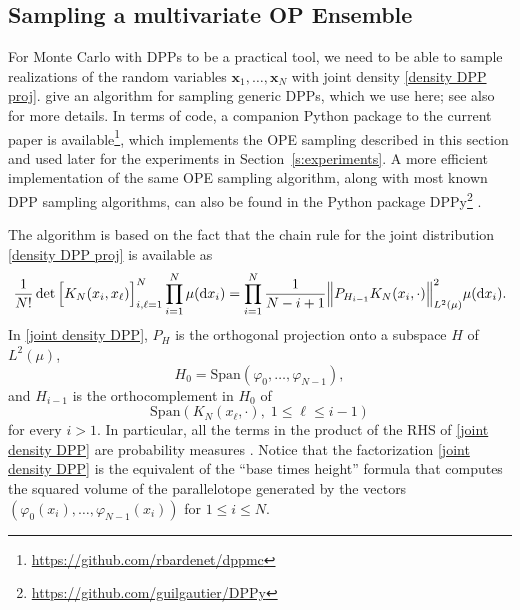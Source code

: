\documentclass[a4paper,11pt]{article}
\numberwithin{equation}{section}
\theoremstyle{definition}
\newcommand{\rev}[1]{#1}
\newcommand{\eq}{\begin{equation}}
\newcommand{\qe}{\end{equation}}
\newcommand{\bv}{\mathbf}
\renewcommand{\leq}{\leqslant}
\renewcommand{\phi}{\varphi}
\renewcommand{\d}{ {\rm d}}
\begin{document}
\subsection{Sampling a multivariate OP Ensemble}
\label{s:sampling}
For Monte Carlo with DPPs to be a practical tool, we need to be able to sample
realizations of the random variables $\bv x_1,\ldots,\bv x_N$ with joint density \eqref{density DPP
  proj}. \cite{HKPV06} give an algorithm for sampling generic DPPs, which we use
here; see also \citep{ScZaTo09, LaMoRu15, OlNaTr15} for more details. In terms of code, \rev{a companion Python package to the current paper is available\footnote{\url{https://github.com/rbardenet/dppmc}}, which implements the OPE sampling described in this section and used later for the experiments in Section~\ref{s:experiments}}. A more efficient implementation of the same OPE sampling algorithm, along with most known DPP sampling algorithms, can also be found in the Python package DPPy\footnote{\url{https://github.com/guilgautier/DPPy}} \citep*{GaBaVa18Sub}.

The algorithm is based on the fact that the chain rule for the joint distribution \eqref{density DPP
  proj} is available as
\eq
\label{joint density DPP}
\frac1{N!}\det\Big[K_N(x_i,x_\ell)\Big]_{i,\ell=1}^N \prod_{i=1}^N\mu(\d x_i)= \prod_{i=1}^N
\frac{1}{N-i+1} \Big\Vert P_{H_{i-1}} K_N(x_i,\cdot)\Big\Vert_{L^2(\mu)}^2 \mu(\d x_i).
\qe
In \eqref{joint density DPP}, $P_H$ is the orthogonal projection onto a subspace $H$ of $L^2(\mu)$,
$$ H_0 = \text{Span}(\phi_0,\dots,\phi_{N-1}),$$
and $H_{i-1}$ is the orthocomplement in $H_0$ of
$$
\text{Span}\left(K_N(x_\ell,\cdot), \; 1\leq \ell\leq i-1\right)
$$
for every $i>1$. In particular, all the terms in the product of the RHS of \eqref{joint density
  DPP} are probability measures \citep[Proposition 19]{HKPV06}. Notice that the factorization \eqref{joint density DPP} is the equivalent of the ``base
times height'' formula that computes the squared volume of the parallelotope
generated by the vectors $(\phi_0(x_i),\ldots,\phi_{N-1}(x_i))$ for $1\leq
i\leq N$.
\end{document}
